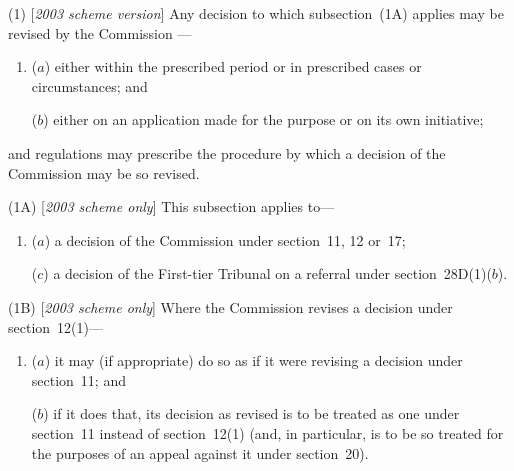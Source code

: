\documentclass[12pt,a4paper]{article}
\begin{document}
(1) [\emph{2003 scheme version}] Any decision 
to which subsection~(1A)  applies  %
may be revised by the 
Commission%
—
\begin{enumerate}\item[]
($a$) either within the prescribed period or in prescribed cases or circumstances; and

($b$) either on an application made for the purpose or on 
its  %
own initiative;
\end{enumerate}
and regulations may prescribe the procedure by which a decision of the 
Commission  %
may be so revised.

(1A) [\emph{2003 scheme only}] This subsection applies to—
\begin{enumerate}\item[]
($a$) a decision of the 
Commission  %
under section~11, 12 or~17;


\begin{sloppypar}
($c$) a decision of 
the First-tier Tribunal  %
on a referral under section~28D(1)($b$).
\end{sloppypar}
\end{enumerate}

(1B) [\emph{2003 scheme only}] Where the 
Commission  %
revises a decision under section~12(1)—
\begin{enumerate}\item[]
($a$) 
it  %
may (if appropriate) do so as if 
it  %
were revising a decision under section~11; and

($b$) if 
it  %
does that, 
its  %
decision as revised is to be treated as one under section~11 instead of section~12(1)  (and, in particular, is to be so treated for the purposes of an appeal against it under section~20).
\end{enumerate}
\end{document}
